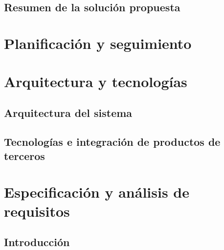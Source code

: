 \documentclass{article}
\begin{document}
    \subsection{Resumen de la solución propuesta}

\section{Planificación y seguimiento}

\section{Arquitectura y tecnologías}

    \subsection{Arquitectura del sistema}

    \subsection{Tecnologías e integración de productos de terceros}

\section{Especificación y análisis de requisitos}

    \subsection{Introducción}
\end{document}

